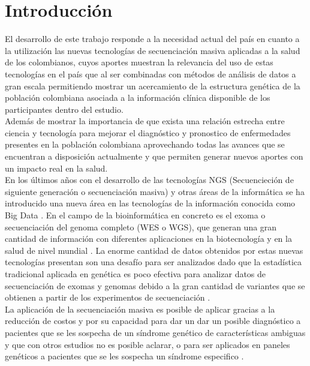 \chapter{Introducci\'{o}n}

El desarrollo de este trabajo responde a la necesidad actual del país en cuanto a la utilización las nuevas tecnologías de secuenciación masiva aplicadas a la salud de los colombianos, cuyos aportes muestran la relevancia del uso de estas tecnologías en el país que al ser combinadas con métodos de análisis de datos a gran escala permitiendo mostrar un acercamiento de la estructura genética de la población colombiana asociada a la información clínica disponible de los participantes dentro del estudio.\\

Además de mostrar la importancia de que exista una relación estrecha entre ciencia y tecnología para mejorar el diagnóstico y pronostico de enfermedades presentes en la población colombiana aprovechando todas las avances que se encuentran a disposición actualmente y que permiten generar nuevos aportes con un impacto real en la salud.\\

En los últimos años con el desarrollo de las tecnologías NGS (Secuencieción de siguiente generación o secuenciación masiva) y otras áreas de la informática se ha introducido una nueva área en las tecnologías de la información conocida como Big Data \cite{Mohammed2014}. En el campo de la bioinformática en concreto es el exoma o secuenciación del genoma completo (WES o WGS), que generan una gran cantidad de información con diferentes aplicaciones en la biotecnología y en la  salud de nivel mundial \cite{Hwang2015}. La enorme cantidad de datos obtenidos por estas nuevas tecnologías presentan son una desafío para ser analizados dado que la estadística tradicional aplicada en genética es poco efectiva para analizar datos de secuenciación de exomas y genomas debido a la gran cantidad de variantes que se obtienen a partir de los experimentos de secuenciación \cite{Wu2014,Mohammed2014}.\\

La aplicación de la secuenciación masiva es posible de aplicar gracias a  la reducción de costos y por su capacidad para dar un dar un posible diagnóstico a pacientes que se les sospecha de un síndrome genético de características ambiguas y que con otros estudios no es posible aclarar, o para ser aplicados en paneles genéticos a pacientes que se les sospecha un síndrome especifico \cite{Hegde2017}.\\

